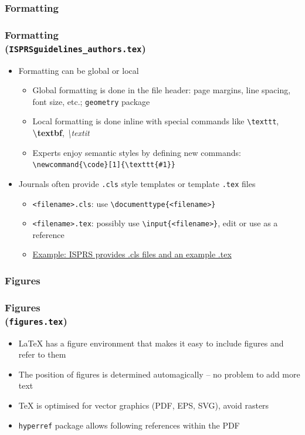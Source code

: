 \documentclass[colorlinks]{beamer} %
\begin{document}
  \subsubsection{Formatting}
  \begin{frame}
    \frametitle{Formatting \\ (\texttt{ISPRSguidelines\_authors.tex})}
    \begin{itemize}
     \item Formatting can be global or local
     \begin{itemize}
      \item Global formatting is done in the file header: page margins, line spacing, font size, etc.; \texttt{geometry} package
      \item Local formatting is done inline with special commands like \texttt{\textbackslash{}texttt}, \textbf{\textbackslash{}textbf}, \textit{\textbackslash{}textit}
      \item Experts enjoy semantic styles by defining new commands: \texttt{\textbackslash{}newcommand\{\textbackslash{}code\}[1]\{\textbackslash{}texttt\{\#1\}\}}
     \end{itemize}
     \item Journals often provide \texttt{.cls} style templates or template \texttt{.tex} files
     \begin{itemize}
      \item \texttt{<filename>.cls}: use \texttt{\textbackslash{}documenttype\{<filename>\}}
      \item \texttt{<filename>.tex}: possibly use \texttt{\textbackslash{}input\{<filename>\}}, edit or use as a reference
      \item \href{http://www.isprs.org/documents/orangebook/app5.aspx}{Example: ISPRS provides .cls files and an example .tex}
     \end{itemize}
    \end{itemize}
  \end{frame}
  
  \subsubsection{Figures}
  \begin{frame}
    \frametitle{Figures \\ (\texttt{figures.tex})}
    \begin{itemize}
     \item \LaTeX{} has a figure environment that makes it easy to include figures and refer to them
     \item The position of figures is determined automagically – no problem to add more text
     \item \TeX{} is optimised for vector graphics (PDF, EPS, SVG), avoid rasters
     \item \texttt{hyperref} package allows following references within the PDF
    \end{itemize}
  \end{frame}
  
\end{document}

